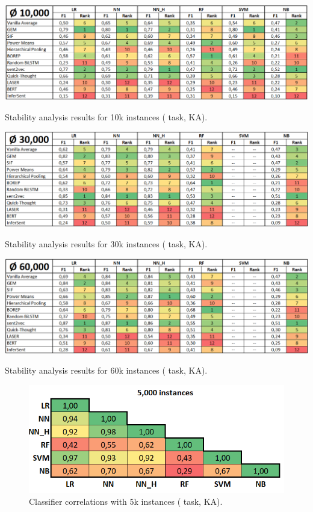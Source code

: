 \begin{table}[H]
	\centering
	\includegraphics[scale=0.55]{images/results_wc_ka_10000}
	\caption[Stability analysis results for 10k instances ( task, KA)]
		{Stability analysis results for 10k instances ( task, KA).}
\end{table}

\begin{table}[H]
	\centering
	\includegraphics[scale=0.55]{images/results_wc_ka_30000}
	\caption[Stability analysis results for 30k instances ( task, KA)]
		{Stability analysis results for 30k instances ( task, KA).}
\end{table}

\begin{table}[H]
	\centering
	\includegraphics[scale=0.55]{images/results_wc_ka_60000}
	\caption[Stability analysis results for 60k instances ( task, KA)]
		{Stability analysis results for 60k instances ( task, KA).}
\end{table}

\begin{figure}[H]
	\centering
	\includegraphics[scale=0.5]{images/corr_wc_ka_5000}
	\caption[Classifier correlations with 5k instances ( task, KA)]
		{Classifier correlations with 5k instances ( task, KA).}
\end{figure}

